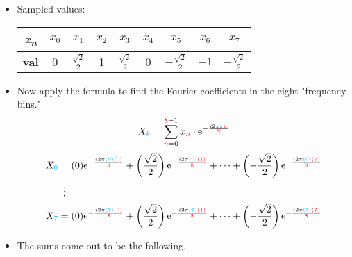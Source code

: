 \documentclass{article}
\begin{document}
\begin{itemize}
\begin{center}
    \end{center}
    \item Sampled values:
    \begin{table}[h!]
        \centering
        \renewcommand{\arraystretch}{1.4}
        \begin{tabular}{c|cccccccc}
            \textbf{\emph{x}\textsubscript{\emph{n}}} & $x_0$ & $x_1$ & $x_2$ & $x_3$ & $x_4$ & $x_5$ & $x_6$ & $x_7$\\
            \hline
            \textbf{val} & 0 & $\frac{\sqrt{2}}{2}$ & 1 & $\frac{\sqrt{2}}{2}$ & 0 & $-\frac{\sqrt{2}}{2}$ & $-1$ & $-\frac{\sqrt{2}}{2}$\\
        \end{tabular}
    \end{table}
    \item Now apply the formula to find the Fourier coefficients in the eight "frequency bins."
    \begin{equation*}
        X_{\color{cyan}k} = \sum_{{\color{red}n}=0}^{{\color{red}8}-1} x_{\color{red}n}\cdot\e[-\frac{i2\pi {\color{cyan}k}{\color{red}n}}{{\color{red}N}}]
    \end{equation*}
    \begin{align}
        \begin{split}\label{aln:bins}
            X_{\color{cyan}0} &= (0)\e[-\frac{i2\pi{\color{cyan}(0)}{\color{red}(0)}}{{\color{red}8}}] + \left( \frac{\sqrt{2}}{2} \right)\e[-\frac{i2\pi{\color{cyan}(0)}{\color{red}(1)}}{{\color{red}8}}] + \cdots + \left( -\frac{\sqrt{2}}{2} \right)\e[-\frac{i2\pi{\color{cyan}(0)}{\color{red}(7)}}{{\color{red}8}}]\\
            &\ \, \vdots\\
            X_{\color{cyan}7} &= (0)\e[-\frac{i2\pi{\color{cyan}(7)}{\color{red}(0)}}{{\color{red}8}}] + \left( \frac{\sqrt{2}}{2} \right)\e[-\frac{i2\pi{\color{cyan}(7)}{\color{red}(1)}}{{\color{red}8}}] + \cdots + \left( -\frac{\sqrt{2}}{2} \right)\e[-\frac{i2\pi{\color{cyan}(7)}{\color{red}(7)}}{{\color{red}8}}]
        \end{split}
    \end{align}
    \item {}The sums come out to be the following.
    \begin{table}[h!]
        \centering
        \renewcommand{\arraystretch}{1.4}

\end{table}
\end{itemize}
\end{document}
